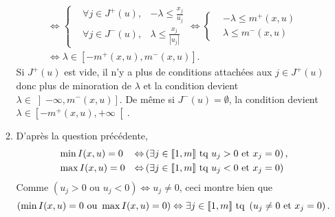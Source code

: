\begin{enumerate}
\begin{enumerate}
\begin{multline*}
  \Leftrightarrow
    \left\lbrace
  \begin{aligned}
    &\forall j \in J^+(u),& -\lambda \leq  \frac{x_j}{u_j}\\
    &\forall j \in J^-(u),& \lambda \leq \frac{x_j}{|u_j|}
  \end{aligned}
  \right. 
  \Leftrightarrow
    \left\lbrace
  \begin{aligned}
    & -\lambda \leq  m^+(x,u)\\
    & \lambda \leq m^-(x,u)
  \end{aligned}
  \right. \\
  \Leftrightarrow \lambda \in \left[ -m^+(x,u), m^-(x,u)\right] .
\end{multline*}
Si $J^+(u)$ est vide, il n'y a plus de conditions attachées aux $j\in J^+(u)$ donc plus de minoration de $\lambda$ et la condition devient $\lambda \in \left] - \infty, m^-(x,u) \right]$. De même si $J^-(u)=\emptyset$, la condition devient $\lambda \in\left[ -m^+(x,u), +\infty \right[$.
    \item D'après la question précédente,
\[
\begin{aligned}
  &\min I(x,u) = 0 &\Leftrightarrow& \left( \exists j \in \llbracket 1 , m \rrbracket \text{ tq } u_j >0 \text{ et } x_j = 0\right), \\
  &\max I(x,u) = 0 &\Leftrightarrow& \left( \exists j \in \llbracket 1 , m \rrbracket \text{ tq } u_j <0 \text{ et } x_j = 0\right)
\end{aligned}
\]
Comme $\left( u_j >0 \text{ ou } u_j < 0\right) \Leftrightarrow u_j \neq 0$, ceci montre bien que 
\[
  \left( \min I(x,u) = 0 \text{ ou } \max I(x,u) = 0\right) \Leftrightarrow \exists j \in \llbracket 1 , m \rrbracket \text{ tq } \left( u_j \neq 0 \text{ et } x_j = 0 \right).
\]
  \end{enumerate}
\end{enumerate}
\newpage

